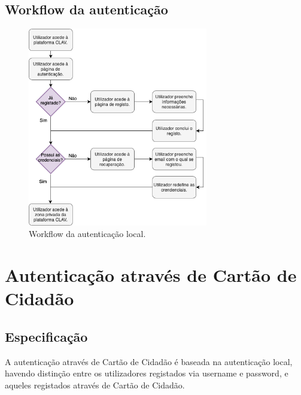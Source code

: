 \subsection{Workflow da autenticação}
\vspace{-5mm}
\begin{figure}[h]
    \centering
    \includegraphics[width=0.7\textwidth]{img/diagramas/authlocal/AuthLocal.png}
    \caption{Workflow da autenticação local.}
    \label{fig:flow_authlocal}
\end{figure}

\cleardoublepage
\section{Autenticação através de Cartão de Cidadão}
\subsection{Especificação}

A autenticação através de Cartão de Cidadão é baseada na autenticação local, havendo distinção entre os utilizadores registados via username e password, e aqueles registados através de Cartão de Cidadão.

